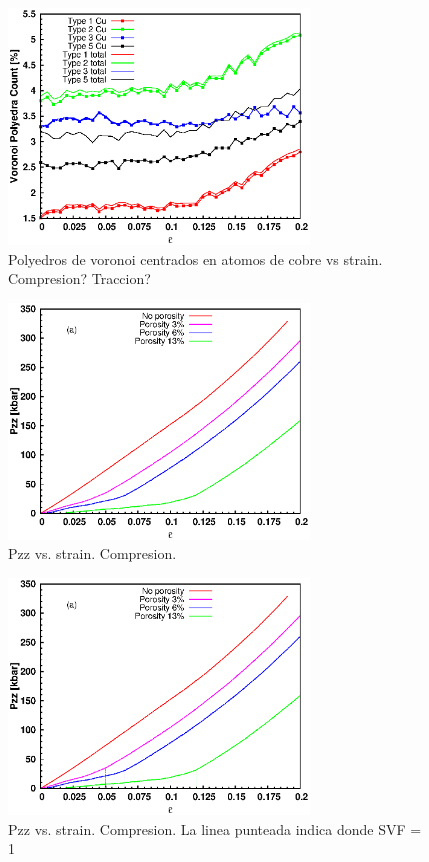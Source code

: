 \documentclass[10pt, oneside]{article} %
\begin{document}
\begin{figure}[H]
\centering
\includegraphics[width=8cm]{Figures/porosity_cu_strain.eps}
\caption{Polyedros de voronoi centrados en atomos de cobre vs strain. Compresion? Traccion?}
\end{figure}

\begin{figure}[H]
\centering
\includegraphics[width=8cm]{Figures/porosity_Pzz_strain_comp.eps}
\caption{Pzz vs. strain. Compresion.}
\end{figure}

\begin{figure}[H]
\centering
\includegraphics[width=8cm]{Figures/porosity_Pzz_strain_comp_dash.eps}
\caption{Pzz vs. strain. Compresion. La linea punteada indica donde SVF = 1}
\end{figure}
\end{document}
